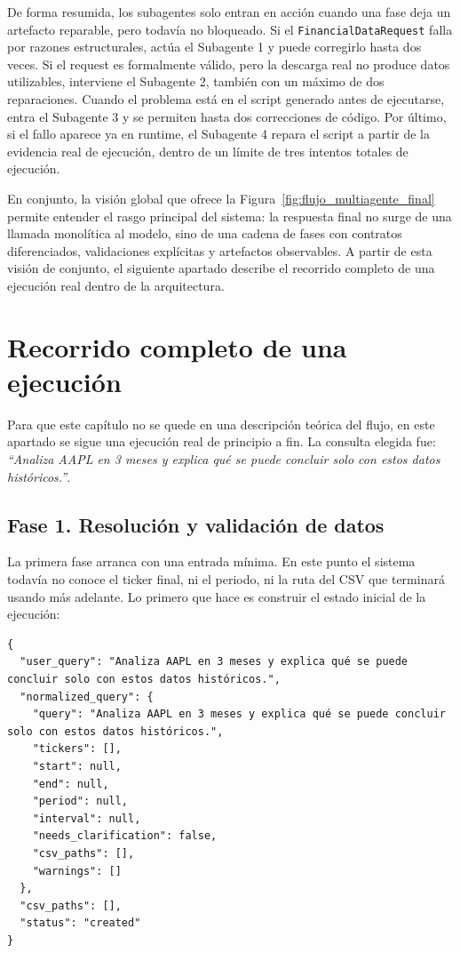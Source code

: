 De forma resumida, los subagentes solo entran en acci\'on cuando una fase deja un artefacto reparable, pero todav\'ia no bloqueado. Si el
\texttt{FinancialDataRequest} falla por razones estructurales, act\'ua el Subagente 1 y puede corregirlo hasta dos veces. Si el request es formalmente
v\'alido, pero la descarga real no produce datos utilizables, interviene el Subagente 2, tambi\'en con un m\'aximo de dos reparaciones. Cuando el problema
est\'a en el script generado antes de ejecutarse, entra el Subagente 3 y se permiten hasta dos correcciones de c\'odigo. Por \'ultimo, si el fallo aparece
ya en runtime, el Subagente 4 repara el script a partir de la evidencia real de ejecuci\'on, dentro de un l\'imite de tres intentos totales de ejecuci\'on.

En conjunto, la visi\'on global que ofrece la Figura~\ref{fig:flujo_multiagente_final} permite entender el rasgo principal del sistema: la respuesta final no surge
de una llamada monol\'itica al modelo, sino de una cadena de fases con contratos diferenciados, validaciones expl\'icitas y artefactos observables. A partir de esta
visi\'on de conjunto, el siguiente apartado describe el recorrido completo de una ejecuci\'on real dentro de la arquitectura.

\section{Recorrido completo de una ejecuci\'on}

Para que este cap\'itulo no se quede en una descripci\'on te\'orica del flujo, en este apartado se sigue una ejecuci\'on real de principio a fin. La consulta
elegida fue: \emph{``Analiza AAPL en 3 meses y explica qu\'e se puede concluir solo con estos datos hist\'oricos.''}. 

\subsection{Fase 1. Resoluci\'on y validaci\'on de datos}

La primera fase arranca con una entrada m\'inima. En este punto el sistema todav\'ia no conoce el ticker final, ni el periodo, ni la ruta del CSV que
terminar\'a usando m\'as adelante. Lo primero que hace es construir el estado inicial de la ejecuci\'on:

\begin{lstlisting}[style=traceblock]
{
  "user_query": "Analiza AAPL en 3 meses y explica qué se puede concluir solo con estos datos históricos.",
  "normalized_query": {
    "query": "Analiza AAPL en 3 meses y explica qué se puede concluir solo con estos datos históricos.",
    "tickers": [],
    "start": null,
    "end": null,
    "period": null,
    "interval": null,
    "needs_clarification": false,
    "csv_paths": [],
    "warnings": []
  },
  "csv_paths": [],
  "status": "created"
}
\end{lstlisting}

